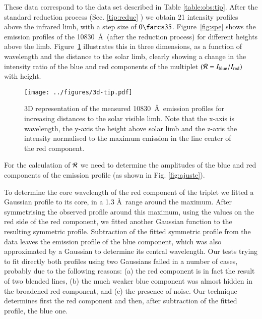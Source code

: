 These data correspond to the data set described in Table \ref{table:obs:tip}. After the standard reduction process (Sec. \ref{tip:reduc} ) we obtain 21 intensity profiles above the infrared limb, with a step size of $0\farcs35$. Figure~\ref{fig:spe} shows the emission profiles of the  10830~\AA\, (after the reduction process) for different heights above the limb. 
Figure~\ref{fig:3d} illustrates this in three dimensions, as a function of
wavelength and the distance to the solar limb, clearly showing 
a change in the intensity ratio of the blue and red components of the 
multiplet $({\cal R}=I_{\rm blue}/I_{\rm red})$ with height. 
%

\begin{figure}[t]
\center \texttt{[image: ../figures/3d-tip.pdf]} 
\caption{3D representation of the measured  10830~\AA\ emission
  profiles for increasing distances to the solar visible limb. Note that the  x-axis is
  wavelength, the y-axis the height above solar limb and the z-axis the intensity
  normalised to the maximum emission in the line center of the red component.}
\label{fig:3d}
\end{figure}


For the calculation of $\cal{R}$ we need to determine the amplitudes of the 
blue and red components of the emission profile (as shown in Fig.  
\ref{fig:ajuste}).

To determine the core wavelength of the red 
component of the triplet we fitted a Gaussian profile to its core, in a 1.3 \AA\ 
range around the maximum. After symmetrising the observed profile around this 
maximum, using the values on the red side of the red component, we fitted another Gaussian 
function to the resulting symmetric profile. Subtraction of the fitted 
symmetric profile from the data leaves the emission profile of the blue 
component, which was also approximated by a Gaussian to determine its central wavelength.  Our tests trying to fit directly both profiles using two Gaussians failed in a number of cases, probably due to the following reasons: (a) the red component is in fact the result of two blended lines, (b) the much weaker blue component was almost hidden in the broadened red component, and (c) the presence of noise. Our technique determines first the red component and then, after subtraction of the fitted profile, the blue one.



